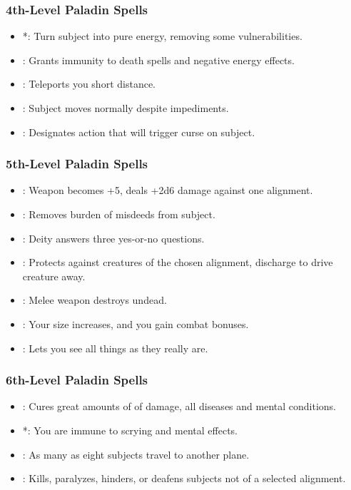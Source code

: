\subsubsection{4th-Level Paladin Spells}
\begin{itemize}
 \item {}*: Turn subject into pure energy, removing some vulnerabilities.
 \item {}: Grants immunity to death spells and negative energy effects.
 \item {}: Teleports you short distance.
 \item {}: Subject moves normally despite impediments.
 \item {}: Designates action that will trigger curse on subject.
\end{itemize}
\subsubsection{5th-Level Paladin Spells}
\begin{itemize}
 \item {}: Weapon becomes +5, deals +2d6 damage against one alignment.
 \item {}: Removes burden of misdeeds from subject.
 \item {}: Deity answers three yes-or-no questions.
 \item {}: Protects against creatures of the chosen alignment, discharge to drive creature away.
 \item {}: Melee weapon destroys undead.
 \item {}: Your size increases, and you gain combat bonuses.
 \item {}: Lets you see all things as they really are.
\end{itemize}
\subsubsection{6th-Level Paladin Spells}
\begin{itemize}
 \item {}: Cures great amounts of of damage, all diseases and mental conditions.
 \item {}*: You are immune to scrying and mental effects.
 \item {}: As many as eight subjects travel to another plane.
 \item {}: Kills, paralyzes, hinders, or deafens subjects not of a selected alignment.
\end{itemize}
